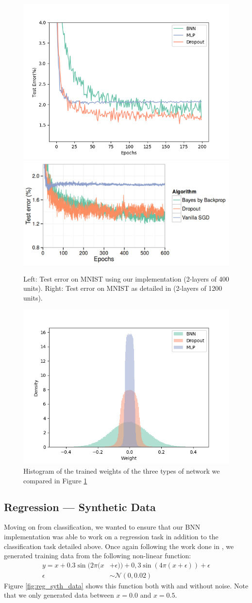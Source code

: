 \documentclass[11pt]{article}
\begin{document}
\begin{figure}
  \centering\includegraphics[width=.45\textwidth]{figures/test_error_compare.png}
  \centering\includegraphics[width=.45\textwidth]{figures/test_error_compare_paper.png}
  \caption{Left: Test error on MNIST using our implementation (2-layers of 400 units).
  Right: Test error on MNIST as detailed in \cite{blundell} (2-layers of 1200 units).}
  \label{fig:mnist_test_error}
\end{figure}

\begin{figure}
  \centering\includegraphics[width=.6\textwidth]{figures/weight_density_compare.png}
  \caption{Histogram of the trained weights of the three types of network we
  compared in Figure \ref{fig:mnist_test_error}}
  \label{fig:mnist_weight_density}
\end{figure}

\subsection{Regression --- Synthetic Data}
Moving on from classification, we wanted to ensure that our BNN implementation 
was able to work on a regression task in addition to the classification task
detailed above. Once again following the work done in \cite{blundell}, we 
generated training data from the following non-linear function:
\begin{align*}
  y = x + 0.3 \sin(2\pi (x &+ \epsilon)) + 0,3 \sin(4\pi (x + \epsilon)) + \epsilon \\
  \epsilon &\sim \mathcal{N}(0, 0.02)
\end{align*}
Figure \ref{fig:reg_syth_data} shows this function both with and without noise.
Note that we only generated data between $x=0.0$ and $x=0.5$.
\end{document}
